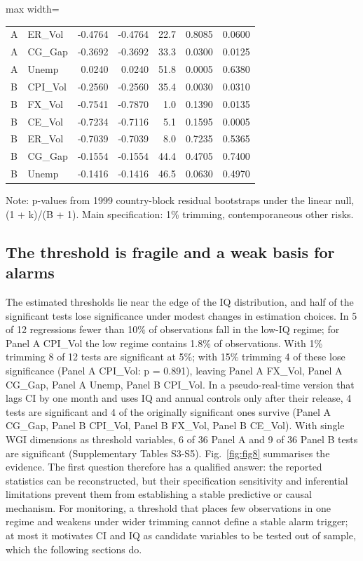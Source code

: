 \documentclass[preprint,12pt,authoryear]{elsarticle}
\begin{document}
\begin{table}[!htbp]
\begin{adjustbox}{max width=\textwidth}
\begin{tabular}{llrrrrr}
A & ER\_Vol & -0.4764 & -0.4764 & 22.7 & 0.8085 & 0.0600 \\
A & CG\_Gap & -0.3692 & -0.3692 & 33.3 & 0.0300 & 0.0125 \\
A & Unemp & 0.0240 & 0.0240 & 51.8 & 0.0005 & 0.6380 \\
B & CPI\_Vol & -0.2560 & -0.2560 & 35.4 & 0.0030 & 0.0310 \\
B & FX\_Vol & -0.7541 & -0.7870 & 1.0 & 0.1390 & 0.0135 \\
B & CE\_Vol & -0.7234 & -0.7116 & 5.1 & 0.1595 & 0.0005 \\
B & ER\_Vol & -0.7039 & -0.7039 & 8.0 & 0.7235 & 0.5365 \\
B & CG\_Gap & -0.1554 & -0.1554 & 44.4 & 0.4705 & 0.7400 \\
B & Unemp & -0.1416 & -0.1416 & 46.5 & 0.0630 & 0.4970 \\
\bottomrule
\end{tabular}
\end{adjustbox}
\par\vspace{2pt}\parbox{0.95\linewidth}{\scriptsize Note: p-values from 1999 country-block residual bootstraps under the linear null, (1 + k)/(B + 1). Main specification: 1\% trimming, contemporaneous other risks.}
\end{table}
\subsection{The threshold is fragile and a weak basis for alarms}
The estimated thresholds lie near the edge of the IQ distribution, and half of the significant tests lose significance under modest changes in estimation choices. In 5 of 12 regressions fewer than 10\% of observations fall in the low-IQ regime; for Panel A CPI\_Vol the low regime contains 1.8\% of observations. With 1\% trimming 8 of 12 tests are significant at 5\%; with 15\% trimming 4 of these lose significance (Panel A CPI\_Vol: p = 0.891), leaving Panel A FX\_Vol, Panel A CG\_Gap, Panel A Unemp, Panel B CPI\_Vol. In a pseudo-real-time version that lags CI by one month and uses IQ and annual controls only after their release, 4 tests are significant and 4 of the originally significant ones survive (Panel A CG\_Gap, Panel B CPI\_Vol, Panel B FX\_Vol, Panel B CE\_Vol). With single WGI dimensions as threshold variables, 6 of 36 Panel A and 9 of 36 Panel B tests are significant (Supplementary Tables S3-S5). Fig.~\ref{fig:fig8} summarises the evidence. The first question therefore has a qualified answer: the reported statistics can be reconstructed, but their specification sensitivity and inferential limitations prevent them from establishing a stable predictive or causal mechanism. For monitoring, a threshold that places few observations in one regime and weakens under wider trimming cannot define a stable alarm trigger; at most it motivates CI and IQ as candidate variables to be tested out of sample, which the following sections do.
\end{document}
